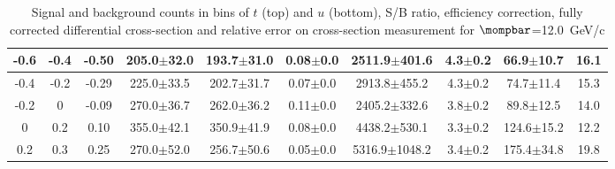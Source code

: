 \begin{landscape}
\begin{table}[hbpt]
\begin{center}
\begin{tabular}{|c|c|c|c|c|c|c|c|c|c|}
 \hline 
 -0.6 & -0.4 & -0.50 & 205.0$\pm$32.0 &  193.7$\pm$31.0 &  0.08$\pm$0.0 &  2511.9$\pm$401.6 & 4.3$\pm$0.2 &  66.9$\pm$10.7 & 16.1 \\ 
 \hline 
 -0.4 & -0.2 & -0.29 & 225.0$\pm$33.5 &  202.7$\pm$31.7 &  0.07$\pm$0.0 &  2913.8$\pm$455.2 & 4.3$\pm$0.2 &  74.7$\pm$11.4 & 15.3 \\ 
 \hline 
 -0.2 & 0 & -0.09 & 270.0$\pm$36.7 &  262.0$\pm$36.2 &  0.11$\pm$0.0 &  2405.2$\pm$332.6 & 3.8$\pm$0.2 &  89.8$\pm$12.5 & 14.0 \\ 
 \hline 
 0 & 0.2 & 0.10 & 355.0$\pm$42.1 &  350.9$\pm$41.9 &  0.08$\pm$0.0 &  4438.2$\pm$530.1 & 3.3$\pm$0.2 &  124.6$\pm$15.2 & 12.2 \\ 
 \hline 
 0.2 & 0.3 & 0.25 & 270.0$\pm$52.0 &  256.7$\pm$50.6 &  0.05$\pm$0.0 &  5316.9$\pm$1048.2 & 3.4$\pm$0.2 &  175.4$\pm$34.8 & 19.8 \\ 
 \hline 
    \end{tabular}
\caption{Signal and background counts in bins of $t$ (top) and $u$
         (bottom), S/B ratio, efficiency correction, fully corrected
         differential cross-section and relative error on cross-section
         measurement for $\mompbar$=12.0~GeV/c}
  \end{center}
\end{table}
\end{landscape}
